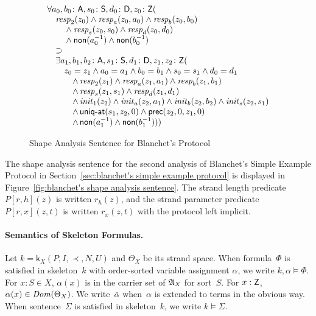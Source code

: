 \documentclass[12pt]{report}
\theoremstyle{definition}
\newcommand{\alga}{\alg{A}}
\newcommand{\sdom}{\fn{Dom}}
\newcommand{\skel}{\mathsf{k}}
\newcommand{\init}{\fn{init}}
\newcommand{\resp}{\fn{resp}}
\begin{document}
\begin{figure}
$$\begin{array}{l}
\all{a_0,b_0\colon\srt{A}, s_0\colon\srt{S}, d_0\colon\srt{D},
z_0\colon\srt{Z}}(\\
\quad\resp_2(z_0)\wedge\resp_{a}(z_0,a_0)\wedge
\resp_{b}(z_0,b_0)\\
\qquad{}\wedge
\resp_{s}(z_0,s_0)\wedge
\resp_{d}(z_0,d_0)\\
\qquad{}\wedge\cn{non}(a_0^{-1})\wedge
\cn{non}(b_0^{-1})\\
\quad\supset\\
\quad\some{a_1,b_1,b_2\colon\srt{A}, s_1\colon\srt{S},
  d_1\colon\srt{D}, z_1,z_2\colon
 \srt{Z}}(\\
\qquad z_0=z_1\wedge a_0=a_1\wedge b_0=b_1\wedge s_0=s_1\wedge
d_0=d_1\\
\qquad\quad\wedge\resp_2(z_1)\wedge
\resp_{a}(z_1,a_1)\wedge
\resp_{b}(z_1,b_1)\\
\qquad\quad\wedge
\resp_{s}(z_1,s_1)\wedge
\resp_{d}(z_1,d_1)\\
\qquad\quad\wedge\init_1(z_2)\wedge\init_a(z_2,a_1)\wedge
\init_b(z_2,b_2)\wedge
\init_s(z_2,s_1)\\
\qquad\quad\wedge\cn{\uniqat}(s_1,z_2,0)\wedge
\cn{prec}(z_2,0,z_1,0)\\
\qquad\quad\wedge\cn{non}(a_1^{-1})\wedge
\cn{non}(b_1^{-1})))
\end{array}$$
\caption{Shape Analysis Sentence for Blanchet's
  Protocol}\label{fig:blanchet's shape analysis sentence}
\end{figure}

The shape analysis sentence for the second analysis of Blanchet's
Simple Example Protocol in Section~\ref{sec:blanchet's simple example
  protocol} is displayed in Figure~\ref{fig:blanchet's shape analysis
  sentence}.  The strand length predicate $P[r,h](z)$ is written
$r_h(z)$, and the strand parameter predicate $P[r,x](z,t)$ is written
$r_x(z,t)$ with the protocol left implicit.

\paragraph{Semantics of Skeleton Formulas.}

Let $k=\skel_X(P,I,\prec,N,U)$ and $\Theta_X$ be its strand space.
When formula~$\Phi$ is satisfied in skeleton~$k$ with order-sorted
variable assignment $\alpha$, we write $k,\alpha\models\Phi$.  For
$x:S\in X$, $\alpha(x)$ is in the carrier set of $\alga_X$ for
sort~$S$.  For $x:\mathsf{Z}$, $\alpha(x)\in\sdom(\Theta_X)$.  We
write~$\bar\alpha$ when~$\alpha$ is extended to terms in the obvious
way.  When sentence~$\Sigma$ is satisfied in skeleton~$k$, we write
$k\models\Sigma$.
\end{document}
